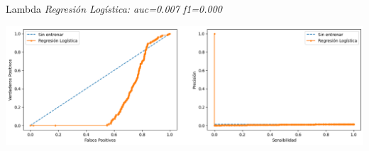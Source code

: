 \documentclass{beamer}
\begin{document}
\begin{frame}{Lambda}
	\textit{Regresión Logística: auc=0.007 f1=0.000 }
	
	\begin{center}\includegraphics[scale=0.35]{figure/lambda.png}\end{center}
	
\end{frame}
\end{document}
